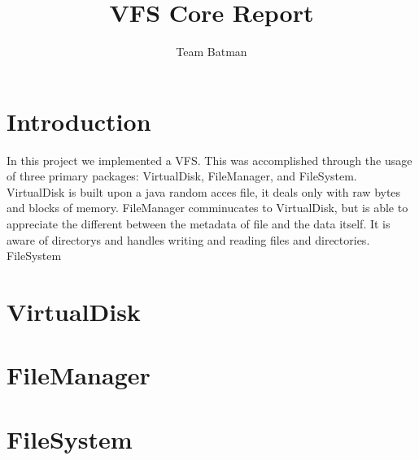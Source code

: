 \documentclass[12pt]{article}
\begin{document}
\title{VFS Core Report}
\author{Team Batman}
\maketitle

\section{Introduction}
In this project we implemented a VFS.  This was accomplished through the usage of three primary packages: VirtualDisk, FileManager, and FileSystem.  VirtualDisk is built upon a java random acces file, it deals only with raw bytes and blocks of memory.  FileManager comminucates to VirtualDisk, but is able to appreciate the different between the metadata of file and the data itself.  It is aware of directorys and handles writing and reading files and directories.  FileSystem

\section{VirtualDisk}

\section{FileManager}

\section{FileSystem}
\end{document}
